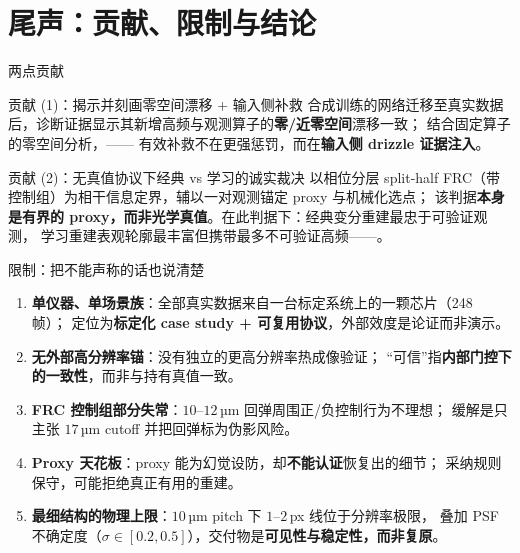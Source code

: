 \section{尾声：贡献、限制与结论}

\begin{frame}{两点贡献}
  \begin{block}{贡献 (1)：揭示并刻画零空间漂移 + 输入侧补救}
    \small
    合成训练的网络迁移至真实数据后，诊断证据显示其新增高频与观测算子的\textbf{零/近零空间}漂移一致；
    结合固定算子的零空间分析，——
    有效补救不在更强惩罚，而在\textbf{输入侧 drizzle 证据注入}。
  \end{block}
  \begin{block}{贡献 (2)：无真值协议下经典 vs 学习的诚实裁决}
    \small
    以相位分层 split-half FRC（带控制组）为相干信息定界，辅以一对观测锚定 proxy 与机械化选点；
    该判据\textbf{本身是有界的 proxy，而非光学真值}。在此判据下：经典变分重建最忠于可验证观测，
    学习重建表观轮廓最丰富但携带最多不可验证高频——。
  \end{block}
\end{frame}

\begin{frame}{限制：把不能声称的话也说清楚}
  \begin{enumerate}
    \small
    \item \textbf{单仪器、单场景族}：全部真实数据来自一台标定系统上的一颗芯片（248 帧）；
          定位为\textbf{标定化 case study + 可复用协议}，外部效度是论证而非演示。
    \item \textbf{无外部高分辨率锚}：没有独立的更高分辨率热成像验证；
          “可信”指\textbf{内部门控下的一致性}，而非与持有真值一致。
    \item \textbf{FRC 控制组部分失常}：$10$--$12\,$µm 回弹周围正/负控制行为不理想；
          缓解是只主张 $17\,$µm cutoff 并把回弹标为伪影风险。
    \item \textbf{Proxy 天花板}：proxy 能为幻觉设防，却\textbf{不能认证}恢复出的细节；
          采纳规则保守，可能拒绝真正有用的重建。
    \item \textbf{最细结构的物理上限}：$10\,$µm pitch 下 $1$--$2\,$px 线位于分辨率极限，
          叠加 PSF 不确定度（$\sigma\in[0.2,0.5]$），交付物是\textbf{可见性与稳定性，而非复原}。
  \end{enumerate}
\end{frame}
